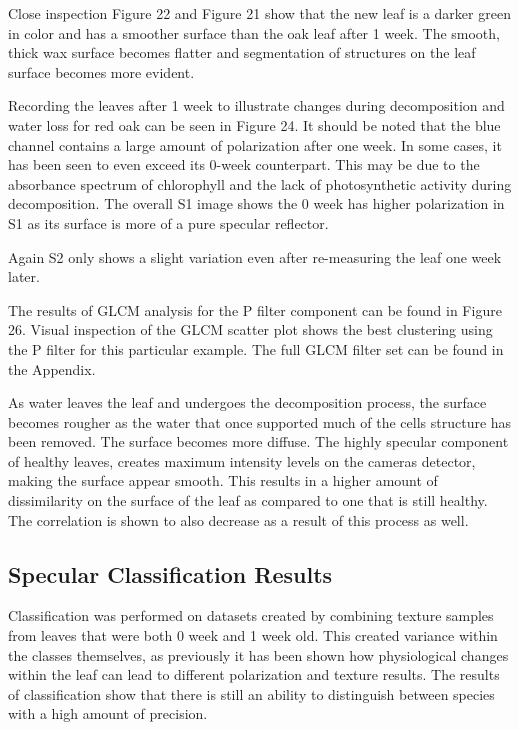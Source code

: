 Close inspection Figure 22 and Figure 21 show that the new leaf is a darker green in color and has a smoother surface than the oak leaf after 1 week.  The smooth, thick wax surface becomes flatter and segmentation of structures on the leaf surface becomes more evident.

Recording the leaves after 1 week to illustrate changes during decomposition and water loss for red oak can be seen in Figure 24.  It should be noted that the blue channel contains a large amount of polarization after one week. In some cases, it has been seen to even exceed its 0-week counterpart. This may be due to the absorbance spectrum of chlorophyll and the lack of photosynthetic activity during decomposition. The overall S1 image shows the 0 week has higher polarization in S1 as its surface is more of a pure specular reflector.
%
\begin{center}
\end{center}
%
\begin{center}
\end{center}
%
Again S2 only shows a slight variation even after re-measuring the leaf one week later.

The results of GLCM analysis for the P filter component can be found in Figure 26.  Visual inspection of the GLCM scatter plot shows the best clustering using the P filter for this particular example.  The full GLCM filter set can be found in the Appendix.
%
\begin{center}
\end{center}
%
As water leaves the leaf and undergoes the decomposition process, the surface becomes rougher as the water that once supported much of the cells structure has been removed. The surface becomes more diffuse.  The highly specular component of healthy leaves, creates maximum intensity levels on the cameras detector, making the surface appear smooth.  This results in a higher amount of dissimilarity on the surface of the leaf as compared to one that is still healthy.  The correlation is shown to also decrease as a result of this process as well.

\subsection{Specular Classification Results}
Classification was performed on datasets created by combining texture samples from leaves that were both 0 week and 1 week old.  This created variance within the classes themselves, as previously it has been shown how physiological changes within the leaf can lead to different polarization and texture results.  The results of classification show that there is still an ability to distinguish between species with a high amount of precision.

